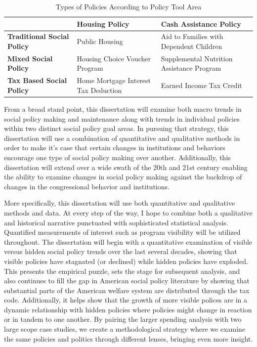 \documentclass[12pt]{article}
\begin{document}
\begin{table}
\centering
    \begin{tabularx}{\textwidth}{XXX} \toprule
           & \textbf{Housing Policy} & \textbf{Cash Assistance Policy} \\ \midrule
    \textbf{Traditional Social Policy} & Public Housing        & Aid to Families with Dependent Children \\
        \textbf{Mixed Social Policy} & Housing Choice Voucher Program        & Supplemental Nutrition Assistance Program \\
    \textbf{Tax Based Social Policy} & Home Mortgage Interest Tax Deduction        & Earned Income Tax Credit \\ \bottomrule
    \end{tabularx}
  \caption{Types of Policies According to Policy Tool Area}
  \label{tab:types}
\end{table}

From a broad stand point, this dissertation will examine both macro trends in social policy making and maintenance along with trends in individual policies within two distinct social policy goal areas. In pursuing that strategy, this dissertation will use a combination of quantitative and qualitative methods in order to make it's case that certain changes in institutions and behaviors encourage one type of social policy making over another. Additionally, this dissertation will extend over a wide swath of the 20th and 21st century enabling the ability to examine changes in social policy making against the backdrop of changes in the congressional behavior and institutions.

More specifically, this dissertation will use both quantitative and qualitative methods and data. At every step of the way, I hope to combine both a qualitative and historical narrative punctuated with sophisticated statistical analysis. Quantified measurements of interest such as program visibility will be utilized throughout. The dissertation will begin with a quantitative examination of visible versus hidden social policy trends over the last several decades, showing that visible policies have stagnated (or declined) while hidden policies have exploded. This presents the empirical puzzle, sets the stage for subsequent analysis, and also continues to fill the gap in American social policy literature by showing that substantial parts of the American welfare system are distributed through the tax code. Additionally, it helps show that the growth of more visible polices are in a dynamic relationship with hidden policies where policies might change in reaction or in tandem to one another. By pairing the larger spending analysis with two large scope case studies, we create a methodological strategy where we examine the same policies and politics through different lenses, bringing even more insight.
\end{document}
